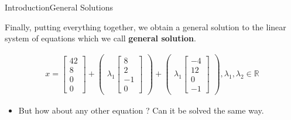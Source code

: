 \documentclass[10pt]{beamer}
\begin{document}
\begin{frame}{Introduction}{General Solutions}

Finally, putting everything together, we obtain a general solution to the linear system of equations which we call \textbf{general solution}.

\begin{align}
x=\begin{bmatrix}42\\8\\0\\0\end{bmatrix} + \begin{pmatrix} \lambda_{1}\begin{bmatrix}8\\2\\-1\\0\end{bmatrix} \end{pmatrix} + \begin{pmatrix} \lambda_{1}\begin{bmatrix}-4\\12\\0\\-1\end{bmatrix} \end{pmatrix}, \lambda_{1},\lambda_{2} \in \mathbb{R}
\end{align}

\begin{itemize}
\item But how about any other equation ? Can it be solved the same way.
\end{itemize}

\end{frame}


\end{document}
